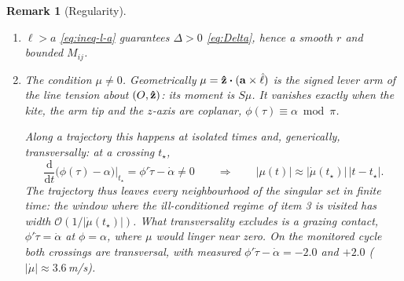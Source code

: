 \documentclass[10pt, a4paper]{article}
\newtheorem{remark}{Remark}
\begin{document}
\begin{remark}[Regularity]
    \label{rem:regularity}
    \begin{enumerate}
        \item $\ell > a$ \eqref{eq:ineq-l-a} guarantees $\Delta > 0$
        \eqref{eq:Delta}, hence a smooth $r$ and bounded $M_{ij}$.
        \item \emph{The condition $\mu \ne 0$.}
        Geometrically $\mu = \vu z \vdot (\vb a \times \lhat)$ is the signed
        lever arm of the line tension about $(O, \vu z)$: its moment is
        $S\mu$.  It vanishes exactly when the kite, the arm tip and the
        $z$-axis are coplanar, $\phi(\tau) \equiv \alpha \bmod \pi$.

        Along a trajectory this happens at isolated times and, generically,
        \emph{transversally}: at a crossing $t_\star$,
        \begin{equation*}
            \frac{\mathrm d}{\mathrm dt}\bigl(\phi(\tau) - \alpha\bigr)
            \Big|_{t_\star}
            = \phi'\dot\tau - \dot\alpha \ne 0
            \qquad\Longrightarrow\qquad
            \lvert\mu(t)\rvert \approx
            \lvert\dot\mu(t_\star)\rvert\, \lvert t - t_\star\rvert .
        \end{equation*}
        The trajectory thus leaves every neighbourhood of the singular set
        in finite time: the window where the ill-conditioned regime of
        item 3 is visited has width
        $\mathcal{O}(1/\lvert\dot\mu(t_\star)\rvert)$.  What transversality
        excludes is a \emph{grazing} contact, $\phi'\dot\tau = \dot\alpha$
        at $\phi = \alpha$, where $\mu$ would linger near zero.  On the
        monitored cycle both crossings are transversal, with measured
        $\phi'\dot\tau - \dot\alpha = -2.0$ and $+2.0$
        ($\lvert\dot\mu\rvert \approx 3.6$\,m/s).


\end{enumerate}
\end{remark}
\end{document}
